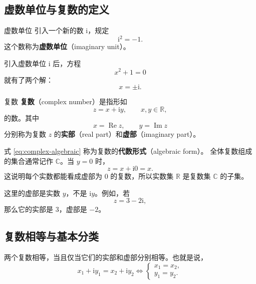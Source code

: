 \subsection{虚数单位与复数的定义}

\begin{dingliyi}{虚数单位}{}
引入一个新的数 $\mathrm{i}$，规定
\begin{equation}
    \mathrm{i}^2=-1.
\end{equation}
这个数称为\textbf{虚数单位}（imaginary unit）。
\end{dingliyi}

引入虚数单位 $\mathrm{i}$ 后，方程
\begin{equation}
    x^2+1=0
\end{equation}
就有了两个解：
\begin{equation}
    x=\pm \mathrm{i}.
\end{equation}

\begin{dingliyi}{复数}{}
\textbf{复数}（complex number）是指形如
\begin{equation}\label{eq:complex-algebraic}
    z=x+\mathrm{i}y,\qquad x,y\in\mathbb{R},
\end{equation}
的数。其中
\begin{equation}
    x=\operatorname{Re}z,\qquad y=\operatorname{Im}z
\end{equation}
分别称为复数 $z$ 的\textbf{实部}（real part）和\textbf{虚部}（imaginary part）。
\end{dingliyi}

式 \eqref{eq:complex-algebraic} 称为复数的\textbf{代数形式}（algebraic form）。
全体复数组成的集合通常记作 $\mathbb{C}$。当 $y=0$ 时，
\[
z=x+\mathrm{i}0=x.
\]
这说明每个实数都能看成虚部为 $0$ 的复数，所以实数集 $\mathbb{R}$ 是复数集 $\mathbb{C}$ 的子集。

\begin{zhu}{}{}
这里的虚部是实数 $y$，不是 $\mathrm{i}y$。例如，若
\[
z=3-2\mathrm{i},
\]
那么它的实部是 $3$，虚部是 $-2$。
\end{zhu}




\subsection{复数相等与基本分类}

两个复数相等，当且仅当它们的实部和虚部分别相等。也就是说，
\begin{equation}
    x_1+\mathrm{i}y_1=x_2+\mathrm{i}y_2
    \Longleftrightarrow
    \begin{cases}
        x_1=x_2,\\
        y_1=y_2.
    \end{cases}
\end{equation}

